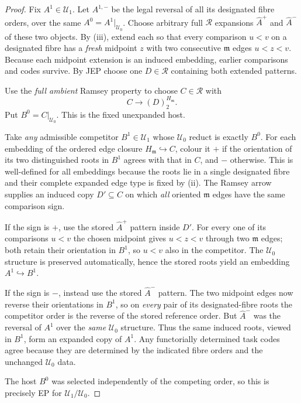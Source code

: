 \begin{proof}
Fix $A^1\in\mathcal U_1$. Let $A^{1,-}$ be the
legal reversal of all its designated fibre orders,
over the same $A^0=A^1|_{\mathcal U_0}$.
Choose arbitrary full $\mathcal R$ expansions
$\widehat A^+$ and $\widehat A^-$ of these two
objects. By (iii), extend each so that every
comparison $u<v$ on a designated fibre has a
\emph{fresh} midpoint $z$ with two consecutive
$\mathfrak m$ edges $u<z<v$.
Because each midpoint extension is an induced
embedding, earlier comparisons and codes survive.
By JEP choose one $D\in\mathcal R$ containing
both extended patterns.

Use the \emph{full ambient} Ramsey property to
choose $C\in\mathcal R$ with
\[
                  C\longrightarrow
                      (D)^{H_{\mathfrak m}}_2 .
\]
Put $B^0=C|_{\mathcal U_0}$.
This is the fixed unexpanded host.

Take \emph{any} admissible competitor
$B^1\in\mathcal U_1$ whose $\mathcal U_0$
reduct is exactly $B^0$. For each embedding
of the ordered edge closure
$H_{\mathfrak m}\hookrightarrow C$, colour
it $+$ if the orientation of its two distinguished
roots in $B^1$ agrees with that in $C$, and $-$
otherwise. This is well-defined for all
embeddings because the roots lie in a single
designated fibre and their complete expanded
edge type is fixed by (ii).
The Ramsey arrow supplies an induced copy
$D'\subseteq C$ on which \emph{all} oriented
$\mathfrak m$ edges have the same comparison sign.

If the sign is $+$, use the stored
$\widehat A^+$ pattern inside $D'$.
For every one of its comparisons $u<v$
the chosen midpoint gives $u<z<v$ through
two $\mathfrak m$ edges; both retain
their orientation in $B^1$, so $u<v$
also in the competitor. The $\mathcal U_0$
structure is preserved automatically, hence
the stored roots yield an embedding
$A^1\hookrightarrow B^1$.

If the sign is $-$, instead use the stored
$\widehat A^-$ pattern. The two midpoint
edges now reverse their orientations in
$B^1$, so on \emph{every} pair of its
designated-fibre roots the competitor order
is the reverse of the stored reference order.
But $\widehat A^-$ was the reversal of
$A^1$ over the \emph{same} $\mathcal U_0$
structure. Thus the same induced roots,
viewed in $B^1$, form an expanded copy
of $A^1$. Any functorially determined task
codes agree because they are determined by
the indicated fibre orders and the unchanged
$\mathcal U_0$ data.

The host $B^0$ was selected independently
of the competing order, so this is precisely
EP for $\mathcal U_1/\mathcal U_0$.
\end{proof}

